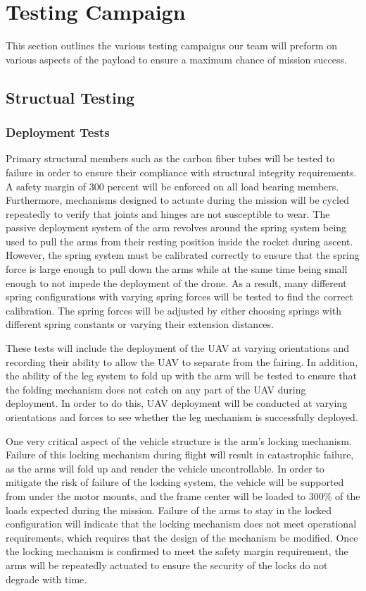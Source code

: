 \chapter{Testing Campaign}

	This section outlines the various testing campaigns our team will preform on various aspects of the payload to ensure a maximum chance of mission success.

\section{Structual Testing}\label{PL:Testing:Structural}
	\subsection{Deployment Tests}
	Primary structural members such as the carbon fiber tubes will be tested to failure in order to ensure their compliance with structural integrity requirements. A safety margin of 300 percent will be enforced on all load bearing members. Furthermore, mechanisms designed to actuate during the mission will be cycled repeatedly to verify that joints and hinges are not susceptible to wear. The passive deployment system of the arm revolves around the spring system being used to pull the arms from their resting position inside the rocket during ascent. However, the spring system must be calibrated correctly to ensure that the spring force is large enough to pull down  the arms while at the same time being small enough to not impede the deployment of the drone. As a result, many different spring configurations with varying spring forces will be tested to find the correct calibration. The spring forces will be adjusted by either choosing springs with different spring constants or varying their extension distances. 

	These tests will include the deployment of the UAV at varying orientations and recording their ability to allow the UAV to separate from the fairing. In addition, the ability of the leg system to fold up with the arm will be tested to ensure that the folding mechanism does not catch on any part of the UAV during deployment. In order to do this, UAV deployment will be conducted at varying orientations and forces to see whether the leg mechanism is successfully deployed.
	
	One very critical aspect of the vehicle structure is the arm’s locking mechanism. Failure of this locking mechanism during flight will result in catastrophic failure, as the arms will fold up and render the vehicle uncontrollable. In order to mitigate the risk of failure of the locking system, the vehicle will be supported from under the motor mounts, and the frame center will be loaded to 300\% of the loads expected during the mission. Failure of the arms to stay in the locked configuration will indicate that the locking mechanism does not meet operational requirements, which requires that the design of the mechanism be modified. Once the locking mechanism is confirmed to meet the safety margin requirement, the arms will be repeatedly actuated to ensure the security of the locks do not degrade with time.
	
